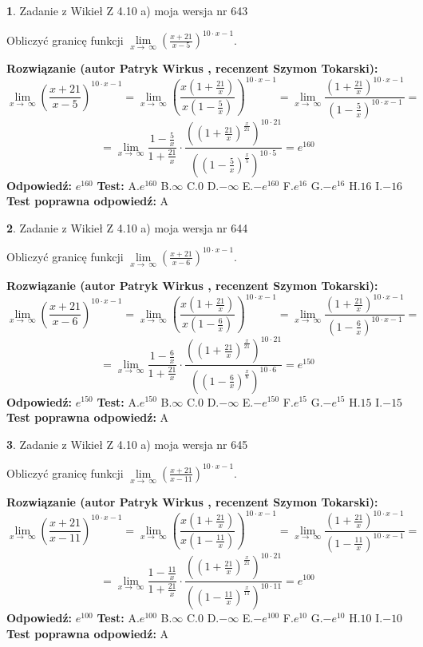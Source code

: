 \documentclass[12pt, a4paper]{article}
\theoremstyle{definition} %
\newtheorem{zad}{}
\newcommand{\zadStart}[1]{\begin{zad}#1\newline}
\newcommand{\zadStop}{\end{zad}}
\newcommand{\rozwStart}[2]{\noindent \textbf{Rozwiązanie (autor #1 , recenzent #2): }\newline}
\newcommand{\rozwStop}{\newline}
\newcommand{\odpStart}{\noindent \textbf{Odpowiedź:}\newline}
\newcommand{\odpStop}{\newline}
\newcommand{\testStart}{\noindent \textbf{Test:}\newline}
\newcommand{\testStop}{\newline}
\newcommand{\kluczStart}{\noindent \textbf{Test poprawna odpowiedź:}\newline}
\newcommand{\kluczStop}{\newline}
\begin{document}
\zadStart{Zadanie z Wikieł Z 4.10 a) moja wersja nr 643}

Obliczyć granicę funkcji  $\lim\limits_{x\to\ \infty}(\frac{x+21}{x-5})^{10\cdot x-1}$.
\zadStop
\rozwStart{Patryk Wirkus}{Szymon Tokarski}
$$\lim\limits_{x\to\ \infty}(\frac{x+21}{x-5})^{10\cdot x-1} = \lim\limits_{x\to\ \infty}(\frac{x(1+\frac{21}{x})}{x(1-\frac{5}{x})})^{10\cdot x-1}=\lim\limits_{x\to\ \infty}\frac{(1+\frac{21}{x})^{10\cdot x-1}}{(1-\frac{5}{x})^{10\cdot x-1}}=$$
$$=\lim\limits_{x\to\ \infty}\frac{1-\frac{5}{x}}{1+\frac{21}{x}}\cdot\frac{((1+\frac{21}{x})^{\frac{x}{21}})^{10\cdot21}}{((1-\frac{5}{x})^{\frac{x}{5}})^{10\cdot5}}=e^{160}$$
\rozwStop
\odpStart
$e^{160}$
\odpStop
\testStart
A.$e^{160}$ B.$\infty$ C.$0$ D.$-\infty$ E.$-e^{160}$
F.$e^{16}$ G.$-e^{16}$
H.$16$
I.$-16$
\testStop
\kluczStart
A
\kluczStop



\zadStart{Zadanie z Wikieł Z 4.10 a) moja wersja nr 644}

Obliczyć granicę funkcji  $\lim\limits_{x\to\ \infty}(\frac{x+21}{x-6})^{10\cdot x-1}$.
\zadStop
\rozwStart{Patryk Wirkus}{Szymon Tokarski}
$$\lim\limits_{x\to\ \infty}(\frac{x+21}{x-6})^{10\cdot x-1} = \lim\limits_{x\to\ \infty}(\frac{x(1+\frac{21}{x})}{x(1-\frac{6}{x})})^{10\cdot x-1}=\lim\limits_{x\to\ \infty}\frac{(1+\frac{21}{x})^{10\cdot x-1}}{(1-\frac{6}{x})^{10\cdot x-1}}=$$
$$=\lim\limits_{x\to\ \infty}\frac{1-\frac{6}{x}}{1+\frac{21}{x}}\cdot\frac{((1+\frac{21}{x})^{\frac{x}{21}})^{10\cdot21}}{((1-\frac{6}{x})^{\frac{x}{6}})^{10\cdot6}}=e^{150}$$
\rozwStop
\odpStart
$e^{150}$
\odpStop
\testStart
A.$e^{150}$ B.$\infty$ C.$0$ D.$-\infty$ E.$-e^{150}$
F.$e^{15}$ G.$-e^{15}$
H.$15$
I.$-15$
\testStop
\kluczStart
A
\kluczStop



\zadStart{Zadanie z Wikieł Z 4.10 a) moja wersja nr 645}

Obliczyć granicę funkcji  $\lim\limits_{x\to\ \infty}(\frac{x+21}{x-11})^{10\cdot x-1}$.
\zadStop
\rozwStart{Patryk Wirkus}{Szymon Tokarski}
$$\lim\limits_{x\to\ \infty}(\frac{x+21}{x-11})^{10\cdot x-1} = \lim\limits_{x\to\ \infty}(\frac{x(1+\frac{21}{x})}{x(1-\frac{11}{x})})^{10\cdot x-1}=\lim\limits_{x\to\ \infty}\frac{(1+\frac{21}{x})^{10\cdot x-1}}{(1-\frac{11}{x})^{10\cdot x-1}}=$$
$$=\lim\limits_{x\to\ \infty}\frac{1-\frac{11}{x}}{1+\frac{21}{x}}\cdot\frac{((1+\frac{21}{x})^{\frac{x}{21}})^{10\cdot21}}{((1-\frac{11}{x})^{\frac{x}{11}})^{10\cdot11}}=e^{100}$$
\rozwStop
\odpStart
$e^{100}$
\odpStop
\testStart
A.$e^{100}$ B.$\infty$ C.$0$ D.$-\infty$ E.$-e^{100}$
F.$e^{10}$ G.$-e^{10}$
H.$10$
I.$-10$
\testStop
\kluczStart
A
\kluczStop
\end{document}
